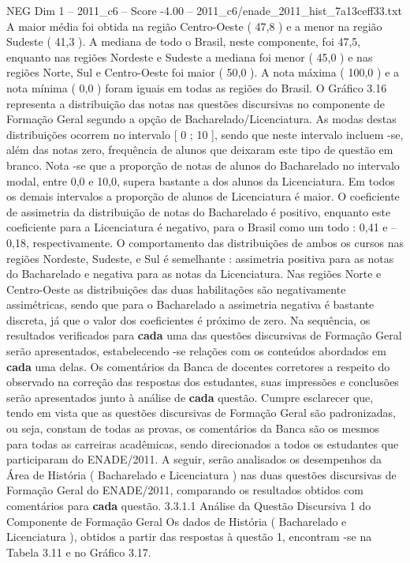 \begin{textsample}{NEG Dim 1 – 2011\_c6 – Score -4.00 – 2011\_c6/enade\_2011\_hist\_7a13ceff33.txt}
A maior média foi obtida na região Centro-Oeste ( 47,8 ) e a menor na região Sudeste ( 41,3 ).
A mediana de todo o Brasil, neste componente, foi 47,5, enquanto nas regiões Nordeste e Sudeste a mediana foi menor ( 45,0 ) e nas regiões Norte, Sul e Centro-Oeste foi maior ( 50,0 ).
A nota máxima ( 100,0 ) e a nota mínima ( 0,0 ) foram iguais em todas as regiões do Brasil.
O Gráfico 3.16 representa a distribuição das notas nas questões discursivas no componente de Formação Geral segundo a opção de Bacharelado/Licenciatura.
As modas destas distribuições ocorrem no intervalo [ 0 ; 10 ], sendo que neste intervalo incluem -se, além das notas zero, frequência de alunos que deixaram este tipo de questão em branco.
Nota -se que a proporção de notas de alunos do Bacharelado no intervalo modal, entre 0,0 e 10,0, supera bastante a dos alunos da Licenciatura.
Em todos os demais intervalos a proporção de alunos de Licenciatura é maior.
O coeficiente de assimetria da distribuição de notas do Bacharelado é positivo, enquanto este coeficiente para a Licenciatura é negativo, para o Brasil como um todo : 0,41 e – 0,18, respectivamente.
O comportamento das distribuições de ambos os cursos nas regiões Nordeste, Sudeste, e Sul é semelhante : assimetria positiva para as notas do Bacharelado e negativa para as notas da Licenciatura.
Nas regiões Norte e Centro-Oeste as distribuições das duas habilitações são negativamente assimétricas, sendo que para o Bacharelado a assimetria negativa é bastante discreta, já que o valor dos coeficientes é próximo de zero.
Na sequência, os resultados verificados para \textbf{cada} uma das questões discursivas de Formação Geral serão apresentados, estabelecendo -se relações com os conteúdos abordados em \textbf{cada} uma delas.
Os comentários da Banca de docentes corretores a respeito do observado na correção das respostas dos estudantes, suas impressões e conclusões serão apresentados junto à análise de \textbf{cada} questão.
Cumpre esclarecer que, tendo em vista que as questões discursivas de Formação Geral são padronizadas, ou seja, constam de todas as provas, os comentários da Banca são os mesmos para todas as carreiras acadêmicas, sendo direcionados a todos os estudantes que participaram do ENADE/2011.
A seguir, serão analisados os desempenhos da Área de História ( Bacharelado e Licenciatura ) nas duas questões discursivas de Formação Geral do ENADE/2011, comparando os resultados obtidos com comentários para \textbf{cada} questão. 3.3.1.1 Análise da Questão Discursiva 1 do Componente de Formação Geral Os dados de História ( Bacharelado e Licenciatura ), obtidos a partir das respostas à questão 1, encontram -se na Tabela 3.11 e no Gráfico 3.17.

\end{textsample}
